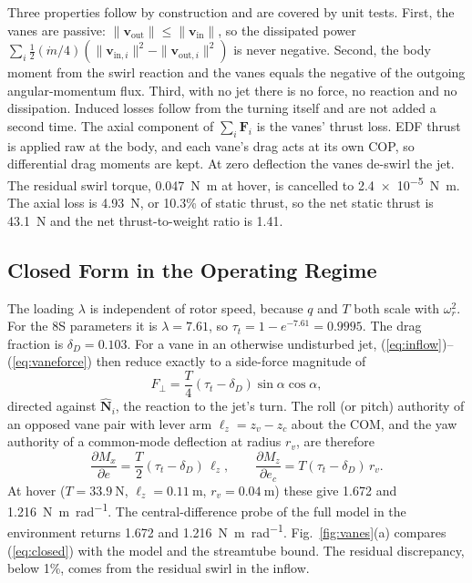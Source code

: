\documentclass[journal]{IEEEtran}
\newcommand{\refeq}[1]{(\ref{#1})}
\newcommand{\reffig}[1]{Fig.~\ref{#1}}
\newcommand{\vect}[1]{\bm{#1}}
\newcommand{\mdot}{\dot{m}}
\newcommand{\wrot}{\omega_r}
\begin{document}
Three properties follow by construction and are covered by unit tests.
First, the vanes are passive: $\|\vect{v}_{\text{out}}\| \le \|\vect{v}_{\text{in}}\|$, so the dissipated power $\sum_i \tfrac12(\mdot/4)(\|\vect{v}_{\text{in},i}\|^2 - \|\vect{v}_{\text{out},i}\|^2)$ is never negative.
Second, the body moment from the swirl reaction and the vanes equals the negative of the outgoing angular-momentum flux.
Third, with no jet there is no force, no reaction and no dissipation.
Induced losses follow from the turning itself and are not added a second time.
The axial component of $\sum_i\vect{F}_i$ is the vanes' thrust loss.
EDF thrust is applied raw at the body, and each vane's drag acts at its own COP, so differential drag moments are kept.
At zero deflection the vanes de-swirl the jet.
The residual swirl torque, \SI{0.047}{\newton\metre} at hover, is cancelled to \SI{2.4e-5}{\newton\metre}.
The axial loss is \SI{4.93}{\newton}, or 10.3\% of static thrust, so the net static thrust is \SI{43.1}{\newton} and the net thrust-to-weight ratio is 1.41.

\subsection{Closed Form in the Operating Regime}
\label{sec:closedform}

The loading $\lambda$ is independent of rotor speed, because $q$ and $T$ both scale with $\wrot^2$.
For the 8S parameters it is $\lambda = 7.61$, so $\tau_t = 1 - e^{-7.61} = 0.9995$.
The drag fraction is $\delta_D = 0.103$.
For a vane in an otherwise undisturbed jet, \refeq{eq:inflow}--\refeq{eq:vaneforce} then reduce exactly to a side-force magnitude of
\begin{equation}
F_{\perp} = \frac{T}{4}\left(\tau_t - \delta_D\right)\sin\alpha\cos\alpha ,
\label{eq:closed}
\end{equation}
directed against $\hat{\vect{N}}_i$, the reaction to the jet's turn.
The roll (or pitch) authority of an opposed vane pair with lever arm $\ell_z = z_v - z_c$ about the COM, and the yaw authority of a common-mode deflection at radius $r_v$, are therefore
\begin{equation}
\frac{\partial M_x}{\partial e} = \frac{T}{2}(\tau_t - \delta_D)\,\ell_z, \qquad
\frac{\partial M_z}{\partial e_c} = T(\tau_t - \delta_D)\,r_v .
\label{eq:authority}
\end{equation}
At hover ($T = \SI{33.9}{\newton}$, $\ell_z = \SI{0.11}{\metre}$, $r_v = \SI{0.04}{\metre}$) these give 1.672 and \SI{1.216}{\newton\metre\per\radian}.
The central-difference probe of the full model in the environment returns 1.672 and \SI{1.216}{\newton\metre\per\radian}.
\reffig{fig:vanes}(a) compares \refeq{eq:closed} with the model and the streamtube bound.
The residual discrepancy, below 1\%, comes from the residual swirl in the inflow.
\end{document}

